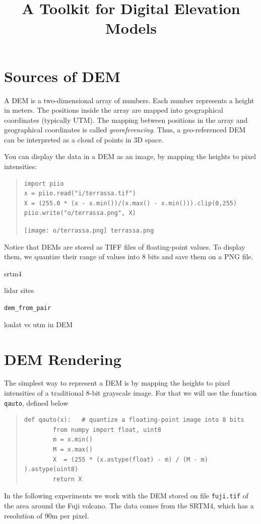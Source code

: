 \title{A Toolkit for Digital Elevation Models}

\section{Sources of DEM}


A DEM is a two-dimensional array of numbers.  Each number
represents a height in meters.  The positions inside the array are mapped into
geographical coordinates (typically UTM).  The mapping between positions in
the array and geographical coordinates is called \emph{georeferencing}.
Thus, a geo-referenced DEM can be interpreted as a cloud of points in 3D
space.

You can display the data in a DEM as an image, by mapping the heights to
pixel intensities:

\begin{quote}
\begin{verbatim}
import piio
x = piio.read("i/terrassa.tif")
X = (255.0 * (x - x.min())/(x.max() - x.min())).clip(0,255)
piio.write("o/terrassa.png", X)
\end{verbatim}
\texttt{[image: o/terrassa.png]}~\verb+terrassa.png+
\end{quote}

Notice that DEMs are stored as TIFF files of floating-point values.  To
display them, we quantize their range of values into 8 bits and save them on
a PNG file.




srtm4

lidar sites


\verb+dem_from_pair+

lonlat vs utm in DEM


\clearpage
\section{DEM Rendering}


The simplest way to represent a DEM is by mapping the heights to pixel
intensities of a traditional 8-bit grayscale image.
For that we will use the function \verb+qauto+, defined below
\begin{quote}
\begin{verbatim}
def qauto(x):   # quantize a floating-point image into 8 bits
        from numpy import float, uint8
        m = x.min()
        M = x.max()
        X  = (255 * (x.astype(float) - m) / (M - m) ).astype(uint8)
        return X
\end{verbatim}
\end{quote}
In the following experiments we work with the DEM stored on file
\verb+fuji.tif+ of the area around the Fuji volcano.  The data comes from
the SRTM4, which has a resolution of 90m per pixel.

